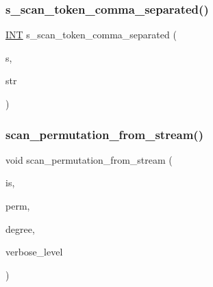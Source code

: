 \mbox{\label{util_8_c_aa57672d188543c5c2047842c5416e2fd}} 
\subsubsection{\texorpdfstring{s\+\_\+scan\+\_\+token\+\_\+comma\+\_\+separated()}{s\_scan\_token\_comma\_separated()}}
{\footnotesize\ttfamily \mbox{\hyperlink{galois_8h_a09fddde158a3a20bd2dcadb609de11dc}{I\+NT}} s\+\_\+scan\+\_\+token\+\_\+comma\+\_\+separated (\begin{DoxyParamCaption}\item[{\mbox{\hyperlink{galois_8h_ab6cc7b4aeb6ea31aba2b3fbfc83ff5e6}{B\+Y\+TE}} $\ast$$\ast$}]{s,  }\item[{\mbox{\hyperlink{galois_8h_ab6cc7b4aeb6ea31aba2b3fbfc83ff5e6}{B\+Y\+TE}} $\ast$}]{str }\end{DoxyParamCaption})}

\mbox{\label{util_8_c_adf84ccaf0a1fda4496d2f60a33c53b88}} 
\subsubsection{\texorpdfstring{scan\+\_\+permutation\+\_\+from\+\_\+stream()}{scan\_permutation\_from\_stream()}}
{\footnotesize\ttfamily void scan\+\_\+permutation\+\_\+from\+\_\+stream (\begin{DoxyParamCaption}\item[{istream \&}]{is,  }\item[{\mbox{\hyperlink{galois_8h_a09fddde158a3a20bd2dcadb609de11dc}{I\+NT}} $\ast$\&}]{perm,  }\item[{\mbox{\hyperlink{galois_8h_a09fddde158a3a20bd2dcadb609de11dc}{I\+NT}} \&}]{degree,  }\item[{\mbox{\hyperlink{galois_8h_a09fddde158a3a20bd2dcadb609de11dc}{I\+NT}}}]{verbose\+\_\+level }\end{DoxyParamCaption})}

\mbox{\label{util_8_c_a93f8c29fa198eae428b44a2dd0eb51bd}} 
